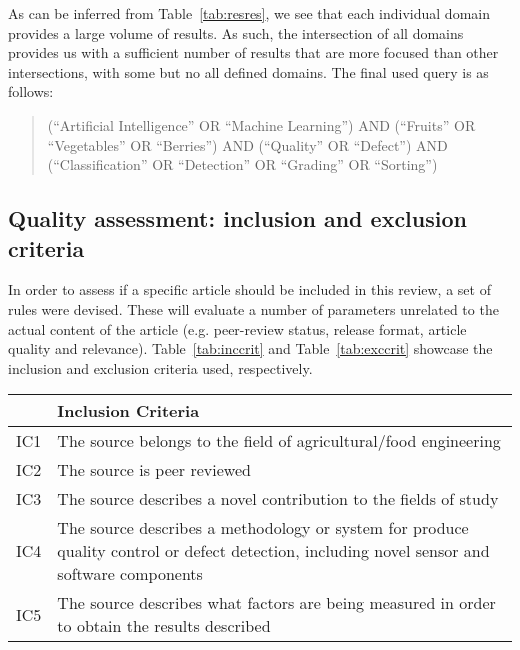 \documentclass[conference]{IEEEtran}
\begin{document}
As can be inferred from Table~\ref{tab:resres}, we see that each individual domain provides a large volume of results. As such, the intersection of all domains provides us with a sufficient number of results that are more focused than other intersections, with some but no all defined domains. The final used query is as follows:

\begin{quote}
 (``Artificial Intelligence'' OR ``Machine Learning'') AND (``Fruits'' OR ``Vegetables'' OR ``Berries'') AND (``Quality'' OR ``Defect'') AND (``Classification'' OR ``Detection'' OR ``Grading'' OR ``Sorting'')
\end{quote}

\subsection{Quality assessment: inclusion and exclusion criteria}

In order to assess if a specific article should be included in this review, a set of rules were devised. These will evaluate a number of parameters unrelated to the actual content of the article (e.g. peer-review status, release format, article quality and relevance). Table~\ref{tab:inccrit} and Table~\ref{tab:exccrit} showcase the inclusion and exclusion criteria used, respectively.

\begin{table*}
	\caption{Inclusion Criteria}
	\label{tab:inccrit}

	\begin{tabular}{ll}
	\hline
		 & Inclusion Criteria \\
	\hline
		IC1 & The source belongs to the field of agricultural/food engineering  \\
		IC2 & The source is peer reviewed \\
		IC3 & The source describes a novel contribution to the fields of study \\
		IC4 & The source describes a methodology or system for produce quality control or defect detection, including novel sensor and software components \\
		IC5 & The source describes what factors are being measured in order to obtain the results described \\
	\hline
	\end{tabular}
\end{table*}
\end{document}
